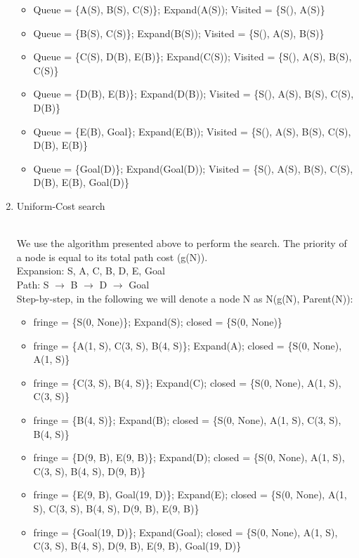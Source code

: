 \documentclass[9pt,a4paper]{extarticle}
\newenvironment{solution}
    {%
    \color{red}
    }
    { 
    \color{black}
    }
\begin{document}
\begin{enumerate}
\begin{solution}
\begin{itemize}
            \item Queue = \{A(S), B(S), C(S)\}; Expand(A(S)); Visited = \{S(), A(S)\}
            \item Queue = \{B(S), C(S)\}; Expand(B(S)); Visited = \{S(), A(S), B(S)\}
            \item Queue = \{C(S), D(B), E(B)\}; Expand(C(S)); Visited = \{S(), A(S), B(S), C(S)\}
            \item Queue = \{D(B), E(B)\}; Expand(D(B)); Visited = \{S(), A(S), B(S), C(S), D(B)\}
            \item Queue = \{E(B), Goal\}; Expand(E(B)); Visited = \{S(), A(S), B(S), C(S), D(B), E(B)\}
            \item Queue = \{Goal(D)\}; Expand(Goal(D)); Visited = \{S(), A(S), B(S), C(S), D(B), E(B), Goal(D)\}
        \end{itemize}
        \end{solution}
        \item Uniform-Cost search
        \begin{solution}
        \\
        We use the algorithm presented above to perform the search. The priority of a node is equal to its total path cost (g(N)).\\
        Expansion: S, A, C, B, D, E, Goal\\
        Path: S $\rightarrow$ B $\rightarrow$ D $\rightarrow$ Goal\\
        Step-by-step, in the following we will denote a node N as N(g(N), Parent(N)):
        \begin{itemize}
            \item fringe = \{S(0, None)\}; Expand(S); closed = \{S(0, None)\}
            \item fringe = \{A(1, S), C(3, S), B(4, S)\}; Expand(A); closed = \{S(0, None), A(1, S)\}
            \item fringe = \{C(3, S), B(4, S)\}; Expand(C); closed = \{S(0, None), A(1, S), C(3, S)\}
            \item fringe = \{B(4, S)\}; Expand(B); closed = \{S(0, None), A(1, S), C(3, S), B(4, S)\}
            \item fringe = \{D(9, B), E(9, B)\}; Expand(D); closed = \{S(0, None), A(1, S), C(3, S), B(4, S), D(9, B)\}
            \item fringe = \{E(9, B), Goal(19, D)\}; Expand(E); closed = \{S(0, None), A(1, S), C(3, S), B(4, S), D(9, B), E(9, B)\}
            \item fringe = \{Goal(19, D)\}; Expand(Goal); closed = \{S(0, None), A(1, S), C(3, S), B(4, S), D(9, B), E(9, B), Goal(19, D)\}

\end{itemize}
\end{solution}
\end{enumerate}
\end{document}
